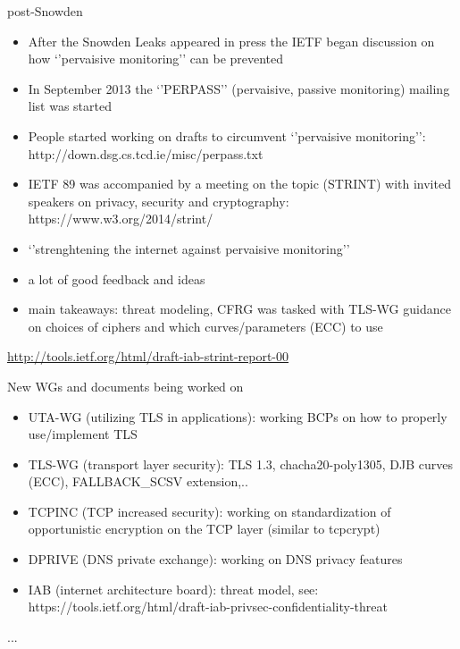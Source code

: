 
\begin{frame}{post-Snowden}
  \begin{itemize}
  \item After the Snowden Leaks appeared in press the IETF began discussion on how
`'pervaisive monitoring'' can be prevented
  \item In September 2013 the `'PERPASS'' (pervaisive, passive monitoring) mailing list was started
  \item People started working on drafts to circumvent `'pervaisive monitoring'': http://down.dsg.cs.tcd.ie/misc/perpass.txt
  \end{itemize}
\end{frame}

\begin{frame}
  \begin{itemize}
    \item IETF 89 was accompanied by a meeting on the topic (STRINT) with invited speakers on privacy, security and cryptography: https://www.w3.org/2014/strint/
    \item `'strenghtening the internet against pervaisive monitoring''
    \item a lot of good feedback and ideas
    \item main takeaways: threat modeling, CFRG was tasked with TLS-WG guidance on choices of ciphers and which curves/parameters (ECC) to use
  \end{itemize}
\tiny
\url{http://tools.ietf.org/html/draft-iab-strint-report-00}
\end{frame}


\begin{frame}{New WGs and documents being worked on }
  \begin{itemize}
    \item UTA-WG (utilizing TLS in applications): working BCPs on how to properly use/implement TLS
    \item TLS-WG (transport layer security): TLS 1.3, chacha20-poly1305, DJB curves (ECC), FALLBACK\_SCSV extension,..
    \item TCPINC (TCP increased security): working on standardization of opportunistic encryption on the TCP layer (similar to tcpcrypt)
    \item DPRIVE (DNS private exchange): working on DNS privacy features
    \item IAB (internet architecture board): threat model, see: https://tools.ietf.org/html/draft-iab-privsec-confidentiality-threat
  \end{itemize}
...
\end{frame}

